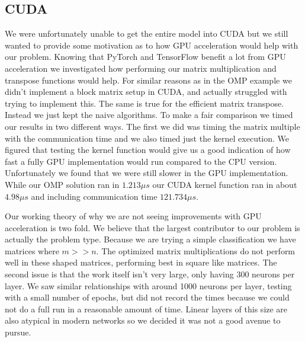 \subsection{CUDA}\label{sec:r-cuda}
We were unfortunately unable to get the entire model into CUDA but we still
wanted to provide some motivation as to how GPU acceleration would help with our
problem. Knowing that PyTorch and TensorFlow benefit a lot from GPU acceleration
we investigated how performing our matrix multiplication and transpose functions
would help. For similar reasons as in the OMP example we didn't implement a
block matrix setup in CUDA, and actually struggled with trying to implement
this. The same is true for the efficient matrix transpose. Instead we just kept
the naive algorithms. To make a fair comparison we timed our results in two
different ways. The first we did was timing the matrix multiple with the
communication time and we also timed just the kernel execution. We figured that
testing the kernel function would give us a good indication of how fast a fully
GPU implementation would run compared to the CPU version. Unfortunately we found
that we were still slower in the GPU implementation. While our OMP solution ran
in $1.213\mu s$ our CUDA kernel function ran in about $4.98\mu s$ and including
communication time $121.734\mu s$.

Our working theory of why we are not seeing improvements with GPU acceleration
is two fold. We believe that the largest contributor to our problem is actually
the problem type. Because we are trying a simple classification we have matrices
where $m>>n$. The optimized matrix multiplications do not perform well in these
shaped matrices, performing best in square like matrices. The second issue is
that the work itself isn't very large, only having 300 neurons per layer. We saw
similar relationships with around 1000 neurons per layer, testing with a small
number of epochs, but did not record the times because we could not do a full
run in a reasonable amount of time. Linear layers of this size are also atypical
in modern networks so we decided it was not a good avenue to pursue. 
